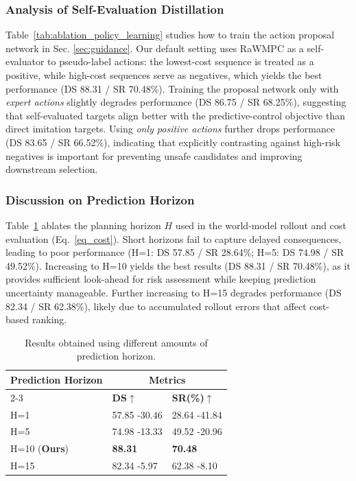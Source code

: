 \documentclass[twocolumn]{template}
\theoremstyle{thmstyleone}%
\theoremstyle{thmstyletwo}%
\theoremstyle{thmstylethree}%
\begin{document}
\subsubsection{Analysis of Self-Evaluation Distillation}
Table~\ref{tab:ablation_policy_learning} studies how to train the action proposal network in Sec. \ref{sec:guidance}.
Our default setting uses RaWMPC as a self-evaluator to pseudo-label actions:
the lowest-cost sequence is treated as a positive, while high-cost sequences serve as negatives,
which yields the best performance (DS 88.31 / SR 70.48\%).
Training the proposal network only with \emph{expert actions} slightly degrades performance (DS 86.75 / SR 68.25\%),
suggesting that self-evaluated targets align better with the predictive-control objective than direct imitation targets.
Using \emph{only positive actions} further drops performance (DS 83.65 / SR 66.52\%),
indicating that explicitly contrasting against high-risk negatives is important for preventing unsafe candidates and improving downstream selection.




\subsubsection{Discussion on Prediction Horizon}

Table~\ref{tab:prediction_horizon} ablates the planning horizon $H$ used in the world-model rollout and cost evaluation (Eq.~\eqref{eq_cost}).
Short horizons fail to capture delayed consequences,
leading to poor performance (H=1: DS 57.85 / SR 28.64\%; H=5: DS 74.98 / SR 49.52\%).
Increasing to H=10 yields the best results (DS 88.31 / SR 70.48\%), as it provides sufficient look-ahead for risk assessment while keeping prediction uncertainty manageable.
Further increasing to H=15 degrades performance (DS 82.34 / SR 62.38\%), likely due to accumulated rollout errors that affect cost-based ranking.

\begin{table}[t]
    \centering
    \setlength{\tabcolsep}{6pt}
    \caption{Results obtained using different amounts of prediction horizon.}
    \begin{tabular}{lll}
        \toprule
        \multirow{2.5}{*}{\textbf{Prediction Horizon}} & \multicolumn{2}{c}{\textbf{Metrics}} \\
        \cmidrule(lr){2-3}
        & \textbf{DS$\uparrow$} & \textbf{SR(\%)$\uparrow$} \\
        \midrule
        H=1
            & 57.85 {\tiny\color{red} -30.46}
            & 28.64 {\tiny\color{red} -41.84} \\
        H=5
            & 74.98 {\tiny\color{red} -13.33}
            & 49.52 {\tiny\color{red} -20.96} \\
        H=10 (\textbf{Ours})
            & \textbf{88.31}
            & \textbf{70.48} \\
        H=15
            & 82.34 {\tiny\color{red} -5.97}
            & 62.38 {\tiny\color{red} -8.10} \\
        \bottomrule
    \end{tabular}
    \label{tab:prediction_horizon}
\end{table}
\end{document}
